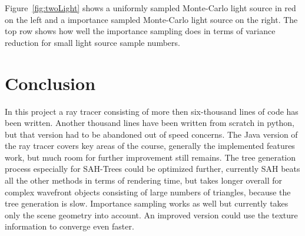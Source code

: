 Figure~\ref{fig:twoLight} shows a uniformly sampled Monte-Carlo light source in red on the left and a importance sampled Monte-Carlo light source on the right. The top row shows how well the importance sampling does in terms of variance reduction for small light source sample numbers.


\section{Conclusion}
In this project a ray tracer consisting of more then six-thousand lines of code has been written. Another thousand lines have been written from scratch in python, but that version had to be abandoned out of speed concerns. The Java version of the ray tracer covers key areas of the course, generally the implemented features work, but much room for further improvement still remains. The tree generation process especially for SAH-Trees could be optimized further, currently SAH beats all the other methods in terms of rendering time, but takes longer overall for complex wavefront objects consisting of large numbers of triangles, because the tree generation is slow.  Importance sampling works as well but currently takes only the scene geometry into account. An improved version could use the texture information to converge even faster. 



